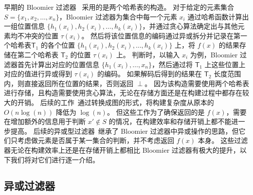 早期的 Bloomier 过滤器~\cite{chazelle2004bloomier} 采用的是两个哈希表的构造。
对于给定的元素集合 $S= \{x_1, x_2, \dots, x_n\}$，Bloomier 过滤器为集合中每一个元素 $x_i$ 通过哈希函数计算出一组位置信息 $\{h_1(x_i), h_2(x_i), \dots, h_k(x_i)\}$，并通过贪心算法确定出与其他元素均不冲突的位置 $\tau(x_i)$。
然后将该位置信息的编码通过异或拆分并记录在第一个哈希表$\mathsf{T}_1$ 的各个位置 $\{h_1(x_i), h_2(x_i), \dots, h_k(x_i)\}$ 上，将 $f(x)$ 的结果存储在第二个哈希表 $\mathsf{T}_2$ 的位置 $\tau(x_i)$ 上。
判断时，以输入 $x_i$ 为例，Bloomier 过滤器首先计算出对应的位置信息 $\{h_1(x_i), \dots, x_n\}$，然后通过将 $\mathsf{T}_1$ 上这些位置上对应的值进行异或得到 $\tau(x_i)$ 的编码。
如果解码后得到的结果在 $\mathsf{T}_2$ 长度范围内，则直接返回所在位置的结果，否则返回 $\perp$。
因为该构造需要使用两个哈希表进行存储，且构造需要使用贪心算法，无论在存储方面还是在构建过程中都存在较大的开销。
后续的工作~\cite{charles2008bloomier}通过转换成图的形式，将构建复杂度从原本的 $O(n\log(n))$ 降低为 $\log(n)$。
但这些工作为了确保返回的是 $f(x)$，需要在增加额外的信息用于判断 $x'\notin S$ 的情况，在构建效率和存储开销上都不能进一步提高。
后续的异或型过滤器~\cite{graf2020xor,dillinger2021ribbon,graf2022binary}继承了 Bloomier 过滤器中异或操作的思路，但它们只考虑做元素是否属于某一集合的判断，并不考虑返回 $f(x)$ 本身。
这些过滤器无论在构建效率上还是在存储开销上都相比 Bloomier 过滤器有极大的提升，以下我们将对它们进行逐一介绍。




\subsection{异或过滤器}


